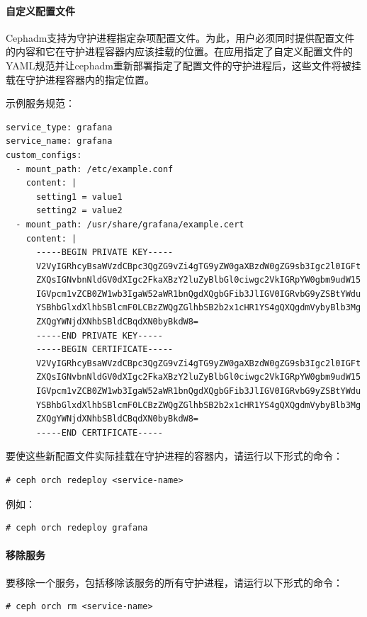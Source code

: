 \documentclass[12pt,UTF8]{ctexbook}
\begin{document}
\paragraph{自定义配置文件}

Cephadm支持为守护进程指定杂项配置文件。为此，用户必须同时提供配置文件的内容和它在守护进程容器内应该挂载的位置。在应用指定了自定义配置文件的YAML规范并让cephadm重新部署指定了配置文件的守护进程后，这些文件将被挂载在守护进程容器内的指定位置。

示例服务规范：

\begin{verbatim}
service_type: grafana
service_name: grafana
custom_configs:
  - mount_path: /etc/example.conf
    content: |
      setting1 = value1
      setting2 = value2
  - mount_path: /usr/share/grafana/example.cert
    content: |
      -----BEGIN PRIVATE KEY-----
      V2VyIGRhcyBsaWVzdCBpc3QgZG9vZi4gTG9yZW0gaXBzdW0gZG9sb3Igc2l0IGFt
      ZXQsIGNvbnNldGV0dXIgc2FkaXBzY2luZyBlbGl0ciwgc2VkIGRpYW0gbm9udW15
      IGVpcm1vZCB0ZW1wb3IgaW52aWR1bnQgdXQgbGFib3JlIGV0IGRvbG9yZSBtYWdu
      YSBhbGlxdXlhbSBlcmF0LCBzZWQgZGlhbSB2b2x1cHR1YS4gQXQgdmVybyBlb3Mg
      ZXQgYWNjdXNhbSBldCBqdXN0byBkdW8=
      -----END PRIVATE KEY-----
      -----BEGIN CERTIFICATE-----
      V2VyIGRhcyBsaWVzdCBpc3QgZG9vZi4gTG9yZW0gaXBzdW0gZG9sb3Igc2l0IGFt
      ZXQsIGNvbnNldGV0dXIgc2FkaXBzY2luZyBlbGl0ciwgc2VkIGRpYW0gbm9udW15
      IGVpcm1vZCB0ZW1wb3IgaW52aWR1bnQgdXQgbGFib3JlIGV0IGRvbG9yZSBtYWdu
      YSBhbGlxdXlhbSBlcmF0LCBzZWQgZGlhbSB2b2x1cHR1YS4gQXQgdmVybyBlb3Mg
      ZXQgYWNjdXNhbSBldCBqdXN0byBkdW8=
      -----END CERTIFICATE-----
\end{verbatim}

要使这些新配置文件实际挂载在守护进程的容器内，请运行以下形式的命令：

\begin{verbatim}
# ceph orch redeploy <service-name>
\end{verbatim}

例如：

\begin{verbatim}
# ceph orch redeploy grafana
\end{verbatim}

\paragraph{移除服务}

要移除一个服务，包括移除该服务的所有守护进程，请运行以下形式的命令：

\begin{verbatim}
# ceph orch rm <service-name>
\end{verbatim}
\end{document}
